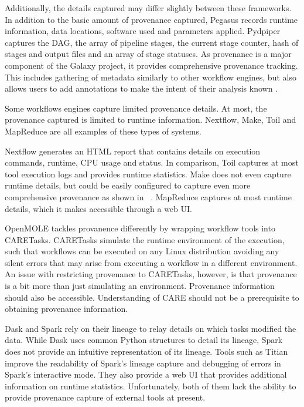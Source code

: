             Additionally, the details captured may differ slightly between 
            these frameworks. In addition to the basic amount of  provenance 
            captured, Pegasus records runtime information, data locations, 
            software used and parameters applied. Pydpiper captures the DAG, the 
            array of pipeline stages, the current stage counter, hash of stages 
            and output files and an array of stage statuses. As provenance is a 
            major component of the Galaxy project, it 
            provides comprehensive provenance tracking. This includes gathering
            of metadata similarly to other workflow engines, but also allows
            users to add annotations to make the intent of their analysis known
            .

            Some workflows engines capture limited provenance details. At 
            most, the provenance captured is limited to runtime information.
            Nextflow, Make, Toil and MapReduce are all examples of these types
            of systems.

            Nextflow generates an
            HTML report that contains details on execution commands, runtime, 
            CPU usage and status. In comparison, Toil captures at most tool 
            execution logs and provides runtime 
            statistics. Make does not even capture runtime details, but could be
            easily configured to capture even more comprehensive provenance as
            shown in ~\cite{10.3389/fninf.2016.00002}. MapReduce captures at 
            most runtime details, which it makes accessible through a web UI.

            OpenMOLE tackles provanence differently by wrapping workflow tools
            into CARETasks. CARETasks simulate the runtime environment of the 
            execution, such that workflows can be executed on any Linux 
            distribution avoiding any silent errors that may arise from 
            executing a workflow in a different environment. An issue with 
            restricting provenance to CARETasks, however, is that provenance is
            a bit more than just simulating an environment. Provenance 
            information should also be accessible. Understanding of CARE should
            not be a prerequisite to obtaining provenance information.
                     
            Dask and Spark rely on their lineage to relay details on which 
            tasks modified the data. While Dask uses common Python structures to 
            detail its lineage, Spark does not provide an intuitive 
            representation of its lineage. Tools such as 
            Titian~\cite{interlandi2018adding} improve the readability of 
            Spark's lineage capture and  debugging of errors in 
            Spark's interactive mode. They also provide a web UI that provides
            additional information on runtime statistics. Unfortunately, both
            of them lack the ability to provide provenance capture of external
            tools at present.

